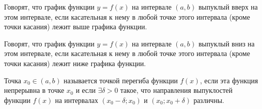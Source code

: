 \begin{definition} \label{def:86}
    Говорят, что график функции $y = f(x)$ на интервале $(a, b)$ выпуклый вверх на этом интервале, если касательная к нему в любой точке этого интервала (кроме точки касания) лежит выше графика функции.
\end{definition}


\begin{definition} \label{def:87}
    Говорят, что график функции $y = f(x)$ на интервале $(a, b)$ выпуклый вниз на этом интервале, если касательная к нему в любой точке этого интервала (кроме точки касания) лежит ниже графика функции.
\end{definition}


\begin{definition} \label{def:88}
    Точка $x_0 \in (a, b)$ называется точкой перегиба функции $f(x)$, если эта функция непрерывна в точке $x_0$ и если $\exists \delta > 0$ такое, что направления выпуклостей функции $f(x)$ на интервалах $(x_0 - \delta; x_0)$ и $(x_0 ; x_0 + \delta)$ различны.
\end{definition}
